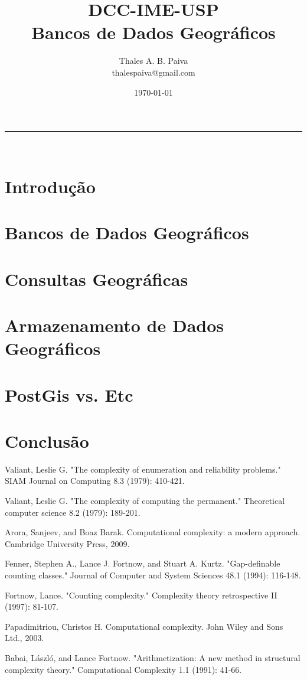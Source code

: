 \documentclass[paper=a4, fontsize=11pt]{scrartcl} %
\title{	
\normalfont \normalsize 
\textsc{DCC-IME-USP} \\ [25pt] %
\huge Bancos de Dados Geográficos%
}
\author{Thales A. B. Paiva \\ thalespaiva@gmail.com} %
\date{\normalsize\today} %
\newcommand{\horrule}[1]{\rule{\linewidth}{#1}} %
\begin{document}
\maketitle %
\horrule{1pt} \\[0.5cm] %

\tableofcontents

\pagebreak
\section{Introdução}

\section{Bancos de Dados Geográficos}

\section{Consultas Geográficas}

\section{Armazenamento de Dados Geográficos}

\section{PostGis vs. Etc}

\section{Conclusão}

\begin{thebibliography}{1}

 Valiant, Leslie G. "The complexity of enumeration and reliability problems." SIAM Journal on Computing 8.3 (1979): 410-421.

 Valiant, Leslie G. "The complexity of computing the permanent." Theoretical computer science 8.2 (1979): 189-201.

 Arora, Sanjeev, and Boaz Barak. Computational complexity: a modern approach. Cambridge University Press, 2009.

 Fenner, Stephen A., Lance J. Fortnow, and Stuart A. Kurtz. "Gap-definable counting classes." Journal of Computer and System Sciences 48.1 (1994): 116-148.

 Fortnow, Lance. "Counting complexity." Complexity theory retrospective II (1997): 81-107.

 Papadimitriou, Christos H. Computational complexity. John Wiley and Sons Ltd., 2003.

 Babai, László, and Lance Fortnow. "Arithmetization: A new method in structural complexity theory." Computational Complexity 1.1 (1991): 41-66.

\end{thebibliography}
\end{document}

